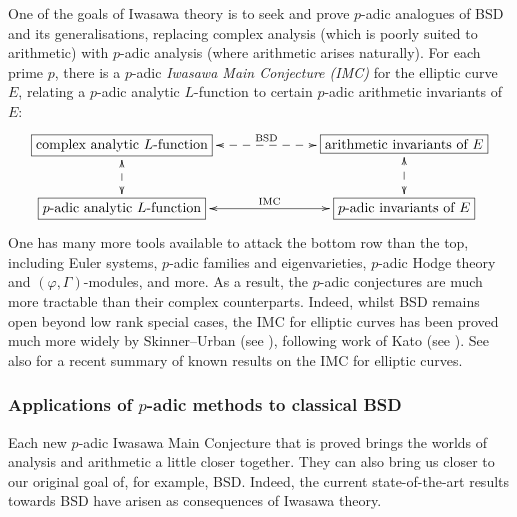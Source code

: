 \documentclass[a4paper,10pt, english, reqno]{smfart}
\numberwithin{equation}{section}
\begin{document}
One of the goals of Iwasawa theory is to seek and prove $p$-adic analogues of BSD and its generalisations, replacing complex analysis (which is poorly suited to arithmetic) with $p$-adic analysis (where arithmetic arises naturally). For each prime $p$, there is a $p$-adic \emph{Iwasawa Main Conjecture (IMC)} for the elliptic curve $E$, relating a $p$-adic analytic $L$-function to certain $p$-adic arithmetic invariants of $E$:
\[
\xymatrix@C=25mm{
	\fbox{complex analytic $L$-function} \ar@{<-->}[r]^-{\text{BSD}}\ar@{<-->}[d] & \fbox{arithmetic invariants of $E$}\ar@{<-->}[d]\\
	\fbox{$p$-adic analytic $L$-function} \ar@{<->}[r]^-{\text{IMC}} & \fbox{$p$-adic invariants of $E$}
}
\]
One has many more tools available to attack the bottom row than the top, including Euler systems, $p$-adic families and eigenvarieties, $p$-adic Hodge theory and $(\varphi,\Gamma)$-modules, and more.  As a result, the $p$-adic conjectures are much more tractable than their complex counterparts. Indeed, whilst BSD remains open beyond low rank special cases, the IMC for elliptic curves has been proved much more widely by Skinner--Urban (see \cite{SU14}), following work of Kato (see \cite{Kat04}). See also \cite{FouquetWan} for a recent summary of known results on the IMC for elliptic curves.



\subsubsection{Applications of $p$-adic methods to classical BSD}
Each new $p$-adic Iwasawa Main Conjecture that is proved brings the worlds of analysis and arithmetic a little closer together. They can also bring us closer to our original goal of, for example, BSD. Indeed, the current state-of-the-art results towards BSD  have arisen as consequences of Iwasawa theory. 
\end{document}
